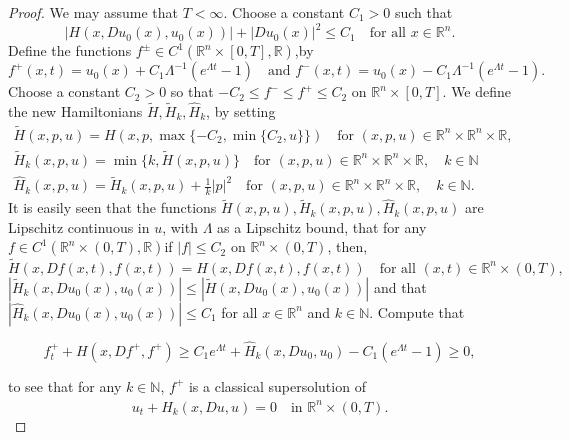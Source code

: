 \documentclass[preprint]{elsarticle}
\numberwithin{equation}{section}
\begin{document}
\begin{proof}
   We may assume that $T < \infty$. Choose a constant $C_1>0$ such that
   \begin{equation}
       |H(x, Du_0(x), u_0(x))| + |Du_0(x)|^2 \leq C_1 \quad \text{for all } x \in \mathbb R^n.
   \end{equation}
   Define the functions $f^\pm \in C^1(\mathbb R^n \times [0, T], \mathbb{R})$,by
   \begin{equation}
       f^+(x, t) = u_0(x) + C_1 \Lambda^{-1}(e^{\Lambda t} - 1) \quad \text{and } f^-(x, t) = u_0(x) - C_1 \Lambda^{-1}(e^{\Lambda t} - 1).
   \end{equation}
   Choose a constant \( C_2 > 0 \) so that \(-C_2 \leq f^- \leq f^+ \leq C_2\) on \( \mathbb R^n \times [0, T] \). 
   We define the new Hamiltonians $\tilde{H}, \tilde{H}_k, \hat{H}_k$, by setting
   \begin{align}
       \tilde{H}(x, p, u) = H(x, p, \max\{-C_2, \min\{C_2, u\}\}) \quad \text{for } (x, p, u) \in \mathbb R^n \times \mathbb R^n \times \mathbb{R},\\
       \tilde{H}_k(x, p, u) =\min\{k, \tilde{H}(x, p, u)\} \quad \text{for } (x, p, u) \in  \mathbb R^n \times \mathbb R^n \times \mathbb{R}, \quad k \in \mathbb{N}\\
       \hat{H}_k(x, p, u) = \tilde{H}_k(x, p, u) + \frac{1}{k} |p|^2 \quad \text{for } (x, p, u) \in  \mathbb R^n \times \mathbb R^n \times \mathbb{R}, \quad k \in \mathbb{N}.
   \end{align}
   It is easily seen that the functions $\tilde{H}(x, p, u), \tilde{H}_k(x, p, u), \hat{H}_k(x, p, u)$ are Lipschitz continuous in $u$, with $\Lambda$ as a Lipschitz bound, that for any $f \in C^1(\mathbb R^n \times (0, T), \mathbb{R})$if \( |f| \leq C_2 \) on \(\mathbb R^n  \times (0, T) \), then,
\[
\tilde{H}(x, D f(x, t), f(x, t)) = H(x, D f(x, t), f(x, t)) \quad \text{for all } (x, t) \in \mathbb R^n \times (0, T),
\]
$|\tilde{H}_k(x, Du_0(x),u_0(x))| \leq |\tilde{H}(x, Du_0(x), u_0(x))|$ and that \( |\hat{H}_k(x, D u_0(x), u_0(x))| \leq C_1 \) for all \( x \in \mathbb R^n \) and \( k \in \mathbb{N} \).
Compute that

\[f_t^+ + H(x, Df^+, f^+) \geq C_1 e^{\Lambda t} + \hat{H}_k(x, Du_0, u_0) - C_1(e^{\Lambda t} - 1) \geq 0,\]

to see that for any \( k \in \mathbb{N} \), \( f^+ \) is a classical supersolution of
\begin{equation}
    u_t + \hat{H}_k(x, D u, u) = 0 \quad \text{in } \mathbb R^n  \times (0, T).\label{Hk}
\end{equation}


\end{proof}
\end{document}
